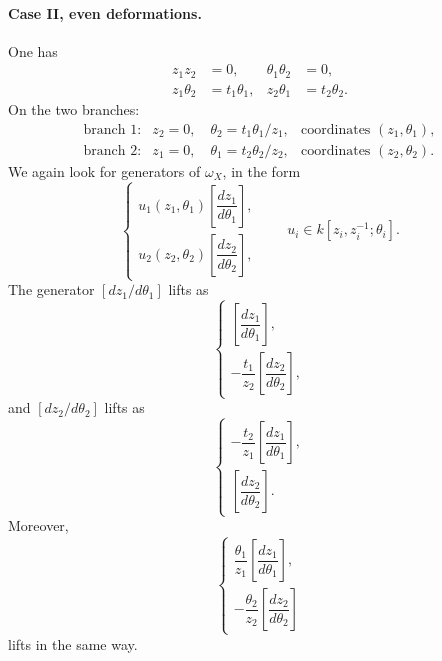 \documentclass[11pt]{article}
\begin{document}
\paragraph{Case II, even deformations.}
One has
\[
\begin{array}{rlrl}
z_1z_2&=0, & \theta_1\theta_2&=0,\\
z_1\theta_2&=t_1\theta_1, & z_2\theta_1&=t_2\theta_2 .
\end{array}
\]
On the two branches:
\[
\begin{array}{lll}
\text{branch 1:}& z_2=0,\quad \theta_2=t_1\theta_1/z_1,
& \text{coordinates }(z_1,\theta_1),\\[1mm]
\text{branch 2:}& z_1=0,\quad \theta_1=t_2\theta_2/z_2,
& \text{coordinates }(z_2,\theta_2).
\end{array}
\]
We again look for generators of $\omega_X$, in the form
\[
\begin{cases}
u_1(z_1,\theta_1)\left[\dfrac{dz_1}{d\theta_1}\right],\\[2mm]
u_2(z_2,\theta_2)\left[\dfrac{dz_2}{d\theta_2}\right],
\end{cases}
\qquad
u_i\in k[z_i,z_i^{-1};\theta_i].
\]
The generator $\left[dz_1/d\theta_1\right]$ lifts as
\[
\begin{cases}
\left[\dfrac{dz_1}{d\theta_1}\right],\\[2mm]
-\dfrac{t_1}{z_2}\left[\dfrac{dz_2}{d\theta_2}\right],
\end{cases}
\]
and $\left[dz_2/d\theta_2\right]$ lifts as
\[
\begin{cases}
-\dfrac{t_2}{z_1}\left[\dfrac{dz_1}{d\theta_1}\right],\\[2mm]
\left[\dfrac{dz_2}{d\theta_2}\right].
\end{cases}
\]
Moreover,
\[
\begin{cases}
\dfrac{\theta_1}{z_1}\left[\dfrac{dz_1}{d\theta_1}\right],\\[2mm]
-\dfrac{\theta_2}{z_2}\left[\dfrac{dz_2}{d\theta_2}\right]
\end{cases}
\]
lifts in the same way.
\end{document}
